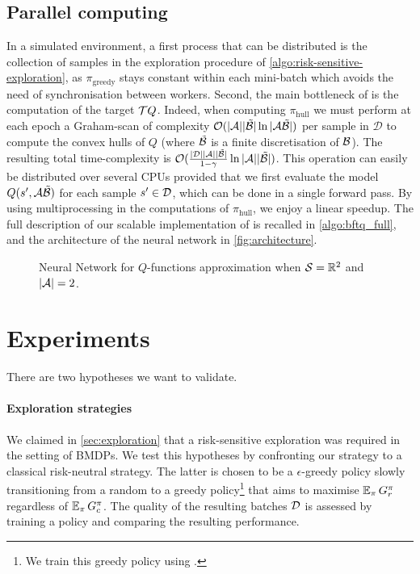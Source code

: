 \subsection{Parallel computing}
\label{subsec:parallel-computing}
In a simulated environment, a first process that can be distributed is the collection of samples in the exploration procedure of \autoref{algo:risk-sensitive-exploration}, as $\pi_\text{greedy}$ stays constant within each mini-batch which avoids the need of synchronisation between workers. Second, the main bottleneck of \BFTQ is the computation of the target $\mathcal{T} Q$. Indeed, when computing $\pi_\text{hull}$ we must perform at each epoch a Graham-scan of complexity $\mathcal{O}(|\mathcal{A}||\tilde{\mathcal{B}}| \ln |\mathcal{A}\tilde{\mathcal{B}}|)$ per sample in $\mathcal{D}$ to compute the convex hulls of $Q$ (where $\tilde{\mathcal{B}}$ is a finite discretisation of $\mathcal{B}$). The resulting total time-complexity is $\mathcal{O}(\frac{|\mathcal{D}||\mathcal{A}||\tilde{\mathcal{B}}|}{1-\gamma} \ln |\mathcal{A}||\tilde{\mathcal{B}}|)$. This operation can easily be distributed over several CPUs provided that we first evaluate the model $Q(s',\mathcal{A}\tilde{\mathcal{B}})$ for each sample $s'\in\mathcal{D}$, which can be done in a single forward pass. By using multiprocessing in the computations of $\pi_\text{hull}$, we enjoy a linear speedup.
The full description of our scalable implementation of \BFTQ is recalled in \autoref{algo:bftq_full}, and the architecture of the neural network in  \autoref{fig:architecture}.


\begin{figure}[tp]
	\centering
	
	\caption{Neural Network for $Q$-functions approximation when $\mathcal{S}=\mathbb{R}^2$ and $|\mathcal{A}| = 2$.}
	\label{fig:architecture}
\end{figure}




\section{Experiments}
\label{sec:experiments}
There are two hypotheses we want to validate.

\paragraph{Exploration strategies}\label{par:ex-explo} We claimed in \autoref{sec:exploration} that a risk-sensitive exploration was required in the setting of BMDPs. We test this hypotheses by confronting our strategy to a classical risk-neutral strategy. The latter is chosen to be a $\epsilon$-greedy policy slowly transitioning from a random to a greedy policy\footnote{We train this greedy policy using \FTQ.} that aims to maximise $\operatorname*{\mathbb{E}}_{\pi} G_r^\pi$ regardless of $\operatorname*{\mathbb{E}}_{\pi} G_c^\pi$. The quality of the resulting batches $\mathcal{D}$ is assessed by training a \BFTQ policy and comparing the resulting performance.

